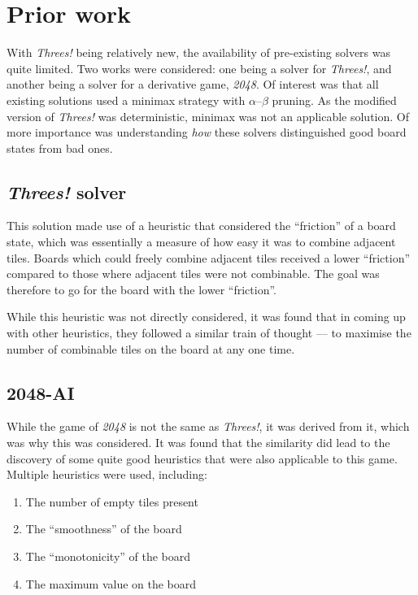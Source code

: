 \documentclass[a4paper, 11pt, titlepage]{report}
\newcommand{\threes}{\emph{Threes!}}
\begin{document}
\section{Prior work}
With \threes{} being relatively new, the availability of pre-existing solvers was quite limited. Two works were considered: one being a solver for \threes{}\cite{tsolver}, and another being a solver for a derivative game, \emph{2048}\cite{2048solver}. Of interest was that all existing solutions used a minimax strategy with $\alpha$--$\beta$ pruning. As the modified version of \threes{} was deterministic, minimax was not an applicable solution. Of more importance was understanding \emph{how} these solvers distinguished good board states from bad ones.

\subsection{\threes{} solver} \label{threes-solver}
This solution\cite{tsolver} made use of a heuristic that considered the ``friction'' of a board state, which was essentially a measure of how easy it was to combine adjacent tiles. Boards which could freely combine adjacent tiles received a lower ``friction'' compared to those where adjacent tiles were not combinable. The goal was therefore to go for the board with the lower ``friction''.

While this heuristic was not directly considered, it was found that in coming up with other heuristics, they followed a similar train of thought --- to maximise the number of combinable tiles on the board at any one time.

\subsection{2048-AI}\label{2048-solver}
While the game of \emph{2048} is not the same as \threes{}, it was derived from it, which was why this was considered. It was found that the similarity did lead to the discovery of some quite good heuristics that were also applicable to this game. Multiple heuristics were used, including:
\begin{enumerate}
	\item{The number of empty tiles present}
	\item{The ``smoothness'' of the board}
	\item{The ``monotonicity'' of the board}
	\item{The maximum value on the board}
\end{enumerate}
\end{document}
